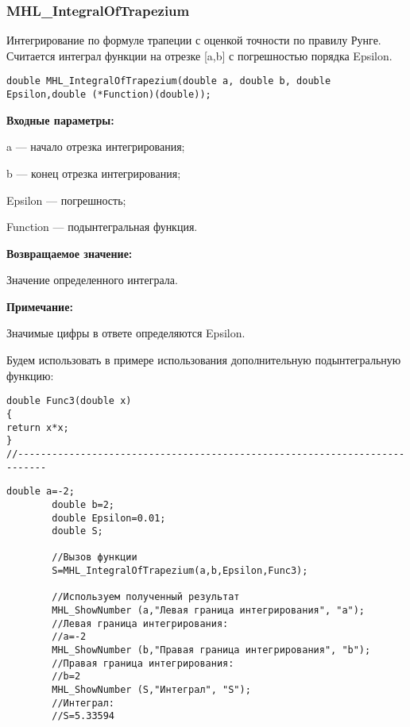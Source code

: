 \documentclass[a4paper,12pt]{article}
\begin{document}
\subsubsection{MHL\_IntegralOfTrapezium}\label{MHL_IntegralOfTrapezium}

Интегрирование по формуле трапеции с оценкой точности по правилу Рунге. Считается интеграл функции на отрезке [a,b] с погрешностью порядка Epsilon.


\begin{lstlisting}[label=code_syntax_MHL_IntegralOfTrapezium,caption=Синтаксис]
double MHL_IntegralOfTrapezium(double a, double b, double Epsilon,double (*Function)(double));
\end{lstlisting}

\textbf{Входные параметры:}

 a --- начало отрезка интегрирования;
 
 b --- конец отрезка интегрирования;
 
 Epsilon --- погрешность;
 
 Function --- подынтегральная функция.

\textbf{Возвращаемое значение:}
 
 Значение определенного интеграла.
 
 \textbf{Примечание:}
 
 Значимые цифры в ответе определяются Epsilon.

Будем использовать в примере использования дополнительную подынтегральную функцию:

\begin{lstlisting}[caption=Дополнительная функция]
double Func3(double x)
{
return x*x;
}
//---------------------------------------------------------------------------
\end{lstlisting}


\begin{lstlisting}[label=code_use_MHL_IntegralOfTrapezium,caption=Пример использования]
        double a=-2;
        double b=2;
        double Epsilon=0.01;
        double S;

        //Вызов функции
        S=MHL_IntegralOfTrapezium(a,b,Epsilon,Func3);

        //Используем полученный результат
        MHL_ShowNumber (a,"Левая граница интегрирования", "a");
        //Левая граница интегрирования:
        //a=-2
        MHL_ShowNumber (b,"Правая граница интегрирования", "b");
        //Правая граница интегрирования:
        //b=2
        MHL_ShowNumber (S,"Интеграл", "S");
        //Интеграл:
        //S=5.33594
\end{lstlisting}
\end{document}
